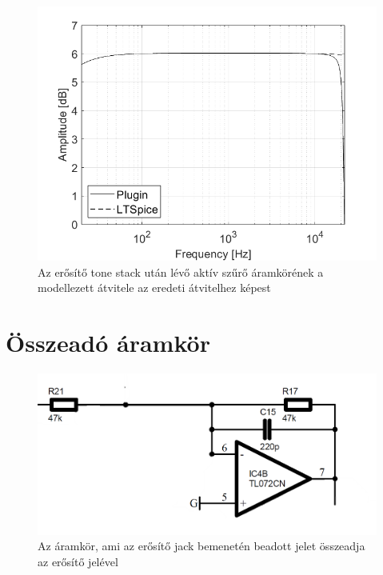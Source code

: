 \begin{figure}[H]
    \centering
    \includegraphics[scale=0.5]{figures/stage5ac.png}
    \caption{Az erősítő tone stack után lévő aktív szűrő áramkörének a modellezett átvitele az eredeti átvitelhez képest}
\end{figure}

\section{Összeadó áramkör}
\begin{figure}[H]
    \centering
    \includegraphics[scale=0.35]{figures/stage6.png}
    \caption{Az áramkör, ami az erősítő jack bemenetén beadott jelet összeadja az erősítő jelével}
\end{figure}

